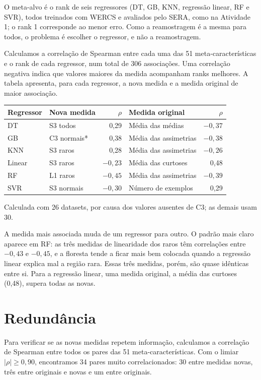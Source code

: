 \documentclass[10pt,a4paper]{article}
\begin{document}
O meta-alvo é o rank de seis regressores (DT, GB, KNN, regressão linear, RF e SVR), todos treinados com WERCS e avaliados pelo SERA, como na Atividade 1; o rank 1 corresponde ao menor erro. Como a reamostragem é a mesma para todos, o problema é escolher o regressor, e não a reamostragem.

Calculamos a correlação de Spearman entre cada uma das 51 meta-características e o rank de cada regressor, num total de 306 associações. Uma correlação negativa indica que valores maiores da medida acompanham ranks melhores. A tabela apresenta, para cada regressor, a nova medida e a medida original de maior associação.

\begin{center}
\small
\begin{tabular}{llrlr}
\toprule
Regressor & Nova medida & $\rho$ & Medida original & $\rho$ \\
\midrule
DT & S3 todos & 0,29 & Média das médias & $-0{,}37$ \\
GB & C3 normais* & 0,38 & Média das assimetrias & $-0{,}38$ \\
KNN & S3 raros & 0,28 & Média das assimetrias & $-0{,}26$ \\
Linear & S3 raros & $-0{,}23$ & Média das curtoses & 0,48 \\
RF & L1 raros & $-0{,}45$ & Média das assimetrias & $-0{,}39$ \\
SVR & S3 normais & $-0{,}30$ & Número de exemplos & 0,29 \\
\bottomrule
\end{tabular}

{\footnotesize *Calculada com 26 datasets, por causa dos valores ausentes de C3; as demais usam 30.}
\end{center}

A medida mais associada muda de um regressor para outro. O padrão mais claro aparece em RF: as três medidas de linearidade dos raros têm correlações entre $-0{,}43$ e $-0{,}45$, e a floresta tende a ficar mais bem colocada quando a regressão linear explica mal a região rara. Essas três medidas, porém, são quase idênticas entre si. Para a regressão linear, uma medida original, a média das curtoses (0,48), supera todas as novas.

\section{Redundância}

Para verificar se as novas medidas repetem informação, calculamos a correlação de Spearman entre todos os pares das 51 meta-características. Com o limiar $|\rho|\geq0{,}90$, encontramos 34 pares muito correlacionados: 30 entre medidas novas, três entre originais e novas e um entre originais.
\end{document}
